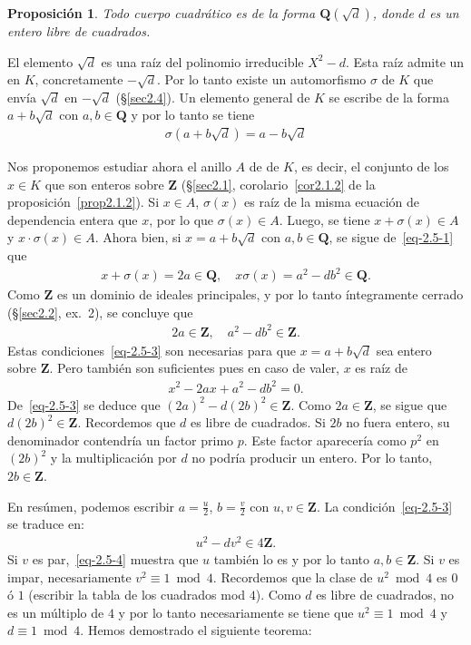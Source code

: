 \documentclass[bibtotoc,leqno,spanish]{amsbook}
\let\emph\relax %
\newcommand{\QQ}{\mathbf{Q}}
\newcommand{\ZZ}{\mathbf{Z}}
\numberwithin{equation}{section}
\theoremstyle{note}
\theoremstyle{note}
\newtheorem{proposition}{Proposici\'on}
\theoremstyle{rem}
\numberwithin{theorem}{section}
\numberwithin{proposition}{section}
\numberwithin{definition}{section}
\numberwithin{lemma}{section}
\numberwithin{corollary}{section}
\numberwithin{example}{section}
\numberwithin{footnote}{section}%
\begin{document}
\begin{proposition}
Todo cuerpo cuadr\'atico es de la forma $\QQ(\sqrt{d})$, donde $d$ es un entero libre de cuadrados.
\end{proposition}

El elemento $\sqrt{d}$ es una ra\'iz del polinomio irreducible $X^{2}-d$. Esta ra\'iz admite un
\emph{conjugado} en $K$, concretamente $-\sqrt{d}$. Por lo tanto existe un automorfismo $\sigma$
de $K$ que env\'ia $\sqrt{d}$ en $-\sqrt{d}$ (\S\ref{sec2.4}). Un elemento general de $K$ se escribe de
la forma $a+b\sqrt{d}$ con $a,b\in\QQ$ y por lo tanto se tiene
\begin{gather}\label{eq-2.5-1}
\sigma(a+b\sqrt{d}) = a-b\sqrt{d}
\end{gather}

Nos proponemos estudiar ahora el anillo $A$ de \emph{enteros} de $K$, es decir, el conjunto de
los $x\in K$ que son enteros sobre $\ZZ$ (\S\ref{sec2.1}, corolario~\ref{cor2.1.2} de la proposici\'on~\ref{prop2.1.2}).
Si $x\in A$, $\sigma(x)$
es ra\'iz de la misma ecuaci\'on de dependencia entera que $x$, por lo que $\sigma(x)\in A$.
Luego, se tiene $x+\sigma(x)\in A$ y $x\cdot\sigma(x)\in A$. Ahora bien, si $x = a+b\sqrt{d}$
con $a,b\in\QQ$, se sigue de~\eqref{eq-2.5-1} que
\begin{gather}
x+\sigma(x) = 2a\in\QQ,\quad x\sigma(x) = a^{2}-db^{2}\in\QQ.
\end{gather}
Como $\ZZ$ es un dominio de ideales principales, y por lo tanto \'integramente cerrado (\S\ref{sec2.2}, ex.~2),
se concluye que
\begin{gather}\label{eq-2.5-3}
2a\in\ZZ,\quad a^{2}-db^{2}\in\ZZ.
\end{gather}
Estas condiciones~\eqref{eq-2.5-3} son necesarias para que $x=a+b\sqrt{d}$ sea entero sobre $\ZZ$. Pero tambi\'en son
suficientes pues en caso de valer, $x$ es ra\'iz de
\begin{gather*}
x^{2}-2ax+a^{2}-db^{2}=0.
\end{gather*}
De~\eqref{eq-2.5-3} se deduce que $(2a)^{2}-d(2b)^{2}\in\ZZ$. Como $2a\in\ZZ$, se sigue que $d(2b)^{2}\in\ZZ$.
Recordemos que $d$ es libre de cuadrados. Si $2b$ no fuera entero, su denominador contendr\'ia un
factor primo $p$. Este factor aparecer\'ia como $p^{2}$ en $(2b)^{2}$ y la multiplicaci\'on por $d$
no podr\'ia producir un entero. Por lo tanto, $2b\in\ZZ$.

En res\'umen, podemos escribir $a = \frac{u}{2}$, $b = \frac{v}{2}$ con $u,v\in\ZZ$. La condici\'on~\eqref{eq-2.5-3}
se traduce en:
\begin{gather}\label{eq-2.5-4}
u^{2}-dv^{2}\in 4\ZZ.
\end{gather}
Si $v$ es par,~\eqref{eq-2.5-4} muestra que $u$ tambi\'en lo es y por lo tanto $a,b\in\ZZ$. Si $v$
es impar, necesariamente $v^{2}\equiv 1\bmod 4$. Recordemos que la clase de $u^{2}\bmod 4$ es $0$ \'o $1$
(escribir la tabla de los cuadrados mod $4$). Como $d$ es libre de cuadrados, no es un m\'ultiplo
de $4$ y por lo tanto necesariamente se tiene que $u^{2}\equiv 1\bmod 4$ y $d\equiv 1\bmod 4$. Hemos
demostrado el siguiente teorema:
\end{document}
